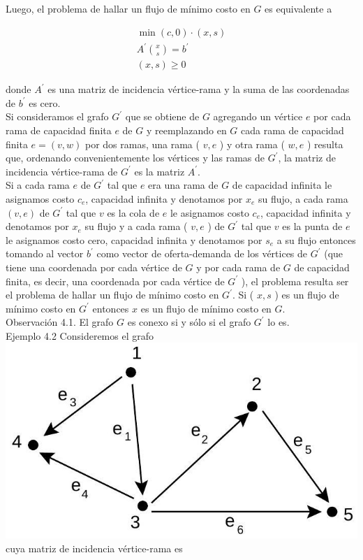\documentclass[10pt]{article}
\begin{document}
Luego, el problema de hallar un flujo de mínimo costo en $G$ es equivalente a

$$
\begin{gathered}
\min (c, 0) \cdot(x, s) \\
A^{\prime}\binom{x}{s}=b^{\prime} \\
(x, s) \geq 0
\end{gathered}
$$

donde $A^{\prime}$ es una matriz de incidencia vértice-rama y la suma de las coordenadas de $b^{\prime}$ es cero.\\
Si consideramos el grafo $G^{\prime}$ que se obtiene de $G$ agregando un vértice $e$ por cada rama de capacidad finita $e$ de $G$ y reemplazando en $G$ cada rama de capacidad finita $e=(v, w)$ por dos ramas, una rama ( $v, e$ ) y otra rama ( $w, e$ ) resulta que, ordenando convenientemente los vértices y las ramas de $G^{\prime}$, la matriz de incidencia vértice-rama de $G^{\prime}$ es la matriz $A^{\prime}$.\\
Si a cada rama $e$ de $G^{\prime}$ tal que $e$ era una rama de $G$ de capacidad infinita le asignamos costo $c_{e}$, capacidad infinita y denotamos por $x_{e}$ su flujo, a cada rama $(v, e)$ de $G^{\prime}$ tal que $v$ es la cola de $e$ le asignamos costo $c_{e}$, capacidad infinita y denotamos por $x_{e}$ su flujo y a cada rama ( $v, e$ ) de $G^{\prime}$ tal que $v$ es la punta de $e$ le asignamos costo cero, capacidad infinita y denotamos por $s_{e}$ a su flujo entonces tomando al vector $b^{\prime}$ como vector de oferta-demanda de los vértices de $G^{\prime}$ (que tiene una coordenada por cada vértice de $G$ y por cada rama de $G$ de capacidad finita, es decir, una coordenada por cada vértice de $G^{\prime}$ ), el problema resulta ser el problema de hallar un flujo de mínimo costo en $G^{\prime}$. Si ( $x, s$ ) es un flujo de mínimo costo en $G^{\prime}$ entonces $x$ es un flujo de mínimo costo en $G$.\\
Observación 4.1. El grafo $G$ es conexo si y sólo si el grafo $G^{\prime}$ lo es.\\
Ejemplo 4.2 Consideremos el grafo\\
\includegraphics[max width=\textwidth, center]{2025_09_05_955b52bfc43174a24a9ag-17}\\
cuya matriz de incidencia vértice-rama es
\end{document}
